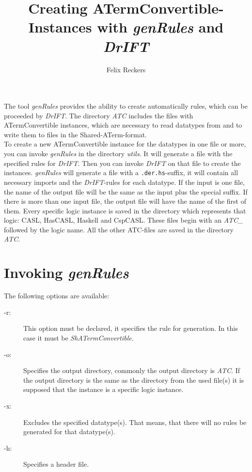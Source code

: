 \documentclass{article}
\title{Creating ATermConvertible-Instances with \emph{genRules} and \emph{DrIFT}}
\author{Felix Reckers}
\begin{document}
\maketitle

The tool \emph{genRules} provides the ability to create automatically rules, which can 
be proceeded by \emph{DrIFT}. The directory \emph{ATC} includes the files with ATermConvertible
instances, which are necessary to read datatypes from and to write them to files in the 
Shared-ATerm-format.\\ 
To create a new ATermConvertible instance for the datatypes in one file or more, you can invoke 
\emph{genRules} in the directory \emph{utils}. It will generate a file with the specified 
rules for \emph{DrIFT}. Then you can invoke \emph{DrIFT} on that file to create the instances.
\emph{genRules} will generate a file with a \verb|.der.hs|-suffix, it will contain all necessary 
imports and the \emph{DrIFT}-rules for each datatype. If the input is one file, the name of the 
output file will be the same as the input plus the special suffix. If there is more than one 
input file, the output file will have the name of the first of them. Every specific logic 
instance is saved in the directory which represents that logic: CASL, HasCASL, Haskell and CspCASL.
These files begin with an
\emph{ATC\_} followed by the logic name. All the other ATC-files are saved in the directory \emph{ATC}.
\section*{Invoking \emph{genRules}}
The following options are available:
\begin{description}
\item[-r:] This option must be declared, it specifies the rule for generation. 
In this case it must be \emph{ShATermConvertible}.
\item[-o:] Specifies the output directory, commonly the output directory is \emph{ATC}. 
If the output directory is the same as the directory from the used file(s) it is supposed 
that the instance is a specific logic instance. 
\item[-x:] Excludes the specified datatype(s). That means, that there will no rules be
 generated for that datatype(s).
\item[-h:] Specifies a header file.
\end{description}
\end{document}
